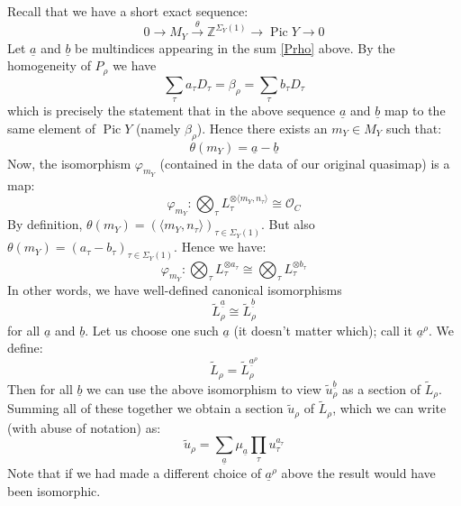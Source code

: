 \documentclass[11pt]{amsart}
\newcommand{\Z}{\mathbb{Z}}
\newcommand{\OO}{\mathcal{O}}
\newcommand{\Pic}{\operatorname{Pic}}
\theoremstyle{plain}
\theoremstyle{definition}
\begin{document}
Recall that we have a short exact sequence:
\begin{equation} \label{Pic short exact sequence for Y} 0 \longrightarrow M_Y \overset{\theta}{\longrightarrow} \Z^{\Sigma_Y(1)} \longrightarrow \Pic Y \longrightarrow 0 \end{equation}
Let $\underline{a}$ and $\underline{b}$ be multindices appearing in the sum \eqref{Prho} above. By the homogeneity of $P_\rho$ we have
\begin{equation*} \sum_\tau a_\tau D_\tau = \beta_\rho = \sum_\tau b_\tau D_\tau \end{equation*}
which is precisely the statement that in the above sequence $\underline{a}$ and $\underline{b}$ map to the same element of $\Pic Y$ (namely $\beta_\rho$). Hence there exists an $m_Y \in M_Y$ such that:
\begin{equation*} \theta(m_Y) = \underline{a} - \underline{b} \end{equation*}
Now, the isomorphism $\varphi_{m_Y}$ (contained in the data of our original quasimap) is a map:
\begin{equation*} \varphi_{m_Y} : \bigotimes_\tau L_\tau^{\otimes \langle m_Y, n_\tau \rangle} \cong \OO_C \end{equation*}
By definition, $\theta(m_Y) = (\langle m_Y,n_\tau \rangle)_{\tau \in \Sigma_Y(1)}$. But also $\theta(m_Y) = (a_\tau - b_\tau)_{\tau \in \Sigma_Y(1)}$. Hence we have:
\begin{equation*} \varphi_{m_Y} : \bigotimes_\tau L_\tau^{\otimes a_\tau} \cong \bigotimes_\tau L_\tau^{\otimes b_\tau} \end{equation*}
In other words, we have well-defined canonical isomorphisms
\begin{equation*} \tilde{L}_\rho^{\underline{a}} \cong \tilde{L}_\rho^{\underline{b}} \end{equation*}
for all $\underline{a}$ and $\underline{b}$. Let us choose one such $\underline{a}$ (it doesn't matter which); call it $\underline{a}^\rho$. We define:
\begin{equation*} \tilde{L}_\rho = \tilde{L}_\rho^{\underline{a}^\rho} \end{equation*}
Then for all $\underline{b}$ we can use the above isomorphism to view $\tilde{u}_\rho^{\underline{b}}$ as a section of $\tilde{L}_\rho$. Summing all of these together we obtain a section $\tilde{u}_\rho$ of $\tilde{L}_\rho$, which we can write (with abuse of notation) as:
\begin{equation*} \tilde{u}_\rho = \sum_{\underline{a}} \mu_{\underline{a}} \prod_\tau u_\tau^{a_\tau} \end{equation*}
Note that if we had made a different choice of $\underline{a}^\rho$ above the result would have been isomorphic.
\end{document}
